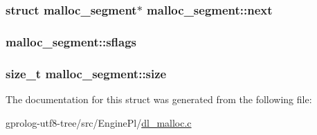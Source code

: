\subsubsection[{\texorpdfstring{next}{next}}]{\setlength{\rightskip}{0pt plus 5cm}struct {\bf malloc\+\_\+segment}$\ast$ malloc\+\_\+segment\+::next}\hypertarget{structmalloc__segment_a92c4c9f618dba33fd8628d743cc02f5a}{}\label{structmalloc__segment_a92c4c9f618dba33fd8628d743cc02f5a}
\subsubsection[{\texorpdfstring{sflags}{sflags}}]{ malloc\+\_\+segment\+::sflags}\hypertarget{structmalloc__segment_ac48f17d9495d732749db6544cabbec2c}{}\label{structmalloc__segment_ac48f17d9495d732749db6544cabbec2c}
\subsubsection[{\texorpdfstring{size}{size}}]{\setlength{\rightskip}{0pt plus 5cm}size\+\_\+t malloc\+\_\+segment\+::size}\hypertarget{structmalloc__segment_a392a23ee3bd7a167e5f6382793a8eba1}{}\label{structmalloc__segment_a392a23ee3bd7a167e5f6382793a8eba1}


The documentation for this struct was generated from the following file\+:\begin{DoxyCompactItemize}
\item 
gprolog-\/utf8-\/tree/src/\+Engine\+Pl/\hyperlink{dl__malloc_8c}{dl\+\_\+malloc.\+c}\end{DoxyCompactItemize}
